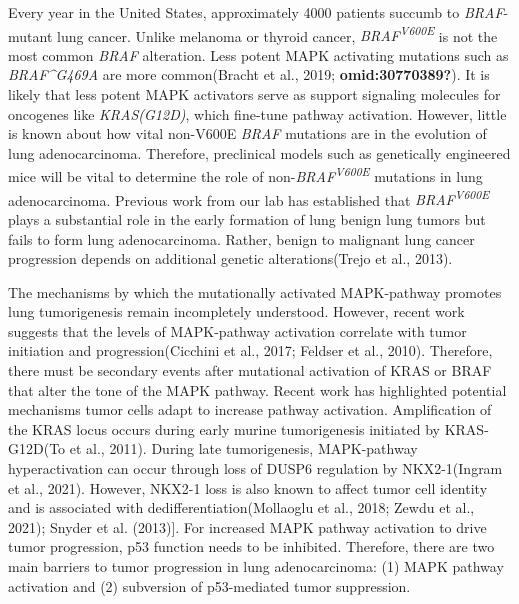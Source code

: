 Every year in the United States, approximately 4000 patients succumb to \emph{BRAF}-mutant lung cancer. Unlike melanoma or thyroid cancer, \emph{BRAF\textsuperscript{V600E}} is not the most common \emph{BRAF} alteration. Less potent MAPK activating mutations such as \emph{BRAF\^{}G469A} are more common(Bracht et al., 2019; \textbf{omid:30770389?}). It is likely that less potent MAPK activators serve as support signaling molecules for oncogenes like \emph{KRAS(G12D)}, which fine-tune pathway activation. However, little is known about how vital non-V600E \emph{BRAF} mutations are in the evolution of lung adenocarcinoma. Therefore, preclinical models such as genetically engineered mice will be vital to determine the role of non-\emph{BRAF\textsuperscript{V600E}} mutations in lung adenocarcinoma. Previous work from our lab has established that \emph{BRAF\textsuperscript{V600E}} plays a substantial role in the early formation of lung benign lung tumors but fails to form lung adenocarcinoma. Rather, benign to malignant lung cancer progression depends on additional genetic alterations(Trejo et al., 2013).

The mechanisms by which the mutationally activated MAPK-pathway promotes lung tumorigenesis remain incompletely understood. However, recent work suggests that the levels of MAPK-pathway activation correlate with tumor initiation and progression(Cicchini et al., 2017; Feldser et al., 2010). Therefore, there must be secondary events after mutational activation of KRAS or BRAF that alter the tone of the MAPK pathway. Recent work has highlighted potential mechanisms tumor cells adapt to increase pathway activation. Amplification of the KRAS locus occurs during early murine tumorigenesis initiated by KRAS-G12D(To et al., 2011). During late tumorigenesis, MAPK-pathway hyperactivation can occur through loss of DUSP6 regulation by NKX2-1(Ingram et al., 2021). However, NKX2-1 loss is also known to affect tumor cell identity and is associated with dedifferentiation(Mollaoglu et al., 2018; Zewdu et al., 2021); Snyder et al. (2013){]}. For increased MAPK pathway activation to drive tumor progression, p53 function needs to be inhibited. Therefore, there are two main barriers to tumor progression in lung adenocarcinoma: (1) MAPK pathway activation and (2) subversion of p53-mediated tumor suppression.

